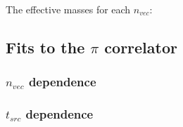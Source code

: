 The effective masses for each $n_{vec}$: 

\subsection{Fits to the $\pi$ correlator}

\subsubsection{$n_{vec}$ dependence}

\subsubsection{$t_{src}$ dependence}

\subsection{}


